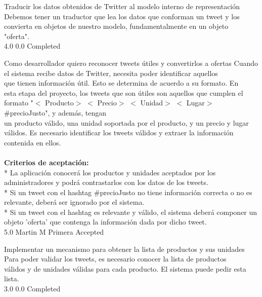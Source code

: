 		{Traducir los datos obtenidos de Twitter al modelo interno de representación} %
		{Debemos tener un traductor que lea los datos que conforman un tweet y los\\
convierta en objetos de nuestro modelo, fundamentalmente en un objeto\\
"oferta".\\
} %
		{4.0} %
		{} %
		{0.0} %
		{Completed} %


\vspace{20pt}

	{Como desarrollador quiero reconocer tweets útiles y convertirlos a ofertas} %
	{Cuando el sistema recibe datos de Twitter, necesita poder identificar aquellos\\
que tienen información útil. Esto se determina de acuerdo a su formato. En\\
esta etapa del proyecto, los tweets que son útiles son aquellos que cumplen el\\
formato "$<$ Producto$>$  $<$ Precio$>$  $<$ Unidad$>$  $<$ Lugar$>$  \#precioJusto", y además, tengan\\
un producto válido, una unidad soportada por el producto, y un precio y lugar\\
válidos. Es necesario identificar los tweets válidos y extraer la información\\
contenida en ellos.\\
  \\
\textbf{Criterios de aceptación:}\\
* La aplicación conocerá los productos y unidades aceptados por los administradores y podrá contrastarlos con los datos de los tweets.  \\
* Si un tweet con el hashtag \#precioJusto no tiene información correcta o no es relevante, deberá ser ignorado por el sistema.  \\
* Si un tweet con el hashtag es relevante y válido, el sistema deberá componer un objeto 'oferta' que contenga la información dada por dicho tweet.\\
} %
	{} %
	{5.0} %
	{Martin M} %
	{Primera} %
	{Accepted} %

		{Implementar un mecanismo para obtener la lista de productos y sus unidades} %
		{Para poder validar los tweets, es necesario conocer la lista de productos\\
válidos y de unidades válidas para cada producto. El sistema puede pedir esta\\
lista.\\
} %
		{3.0} %
		{} %
		{0.0} %
		{Completed} %

